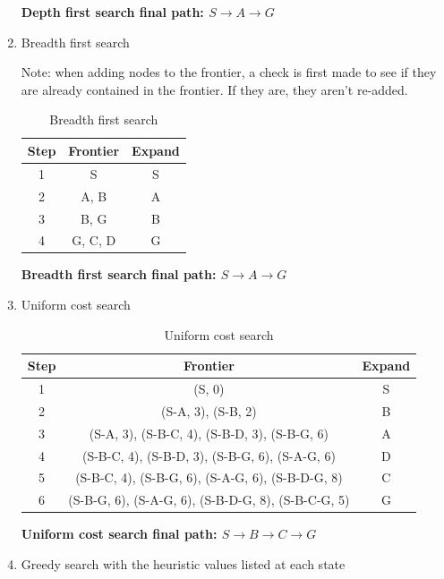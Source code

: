 \documentclass[fleqn]{hermans-hw}
\begin{document}
\begin{enumerate}
\textbf{Depth first search final path: $S \rightarrow A \rightarrow G$}

\item Breadth first search

Note: when adding nodes to the frontier, a check is first made to see if they are already contained in the frontier. If they are, they aren't re-added.

\begin{table}[H]
\centering
{\renewcommand{\arraystretch}{1.2}%
\begin{tabular}{| c | c | c |}
\hline
\textbf{Step} & \textbf{Frontier} & \textbf{Expand}\\
\hline
1 & S & S\\ \hline
2 & A, B & A\\ \hline
3 & B, G & B\\ \hline
4 & G, C, D & G\\ \hline
\end{tabular}}
\caption{Breadth first search}
\end{table}

\textbf{Breadth first search final path: $S \rightarrow A \rightarrow G$}

\item Uniform cost search

\begin{table}[H]
\centering
{\renewcommand{\arraystretch}{1.2}%
\begin{tabular}{| c | c | c |}
\hline
\textbf{Step} & \textbf{Frontier} & \textbf{Expand}\\
\hline
1 & (S, 0) & S\\ \hline
2 & (S-A, 3), (S-B, 2) & B\\ \hline
3 & (S-A, 3), (S-B-C, 4), (S-B-D, 3), (S-B-G, 6) & A\\ \hline
4 & (S-B-C, 4), (S-B-D, 3), (S-B-G, 6), (S-A-G, 6) & D\\ \hline
5 & (S-B-C, 4), (S-B-G, 6), (S-A-G, 6), (S-B-D-G, 8) & C\\ \hline
6 & (S-B-G, 6), (S-A-G, 6), (S-B-D-G, 8), (S-B-C-G, 5) & G\\ \hline
\end{tabular}}
\caption{Uniform cost search}
\end{table}

\textbf{Uniform cost search final path: $S \rightarrow B \rightarrow C \rightarrow G$}

\item Greedy search with the heuristic values listed at each state


\end{enumerate}
\end{document}
